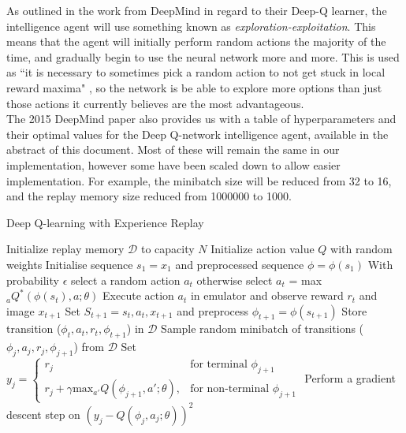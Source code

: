 \documentclass[10pt]{article}
\begin{document}
		As outlined in the work from DeepMind in regard to their Deep-Q learner, the intelligence agent will use something known as \textit{exploration-exploitation}. This means that the agent will initially perform random actions the majority of the time, and gradually begin to use the neural network more and more. This is used as ``it is necessary to sometimes pick a random action to not get stuck in local reward maxima" \cite{repli}, so the network is be able to explore more options than just those actions it currently believes are the most advantageous.\\
		
		The 2015 DeepMind paper also provides us with a table of hyperparameters and their optimal values for the Deep Q-network intelligence agent, available in the abstract of this document. Most of these will remain the same in our implementation, however some have been scaled down to allow easier implementation. For example, the minibatch size will be reduced from 32 to 16, and the replay memory size reduced from 1000000 to 1000.
		
		\begin{algorithm}
			\caption{Deep Q-learning with Experience Replay \cite{humanlevel}}
			\label{algo:agentAlgo}
			\begin{algorithmic}[]
				\State Initialize replay memory $\mathcal{D}$ to capacity $N$
				\State Initialize action value $Q$ with random weights				
					\State Initialise sequence $s_1 = {x_1}$ and preprocessed sequence $\phi = \phi(s_1)$
						\State With probability $\epsilon$ select a random action $a_t$
						\State otherwise select $a_t$ = max$_aQ^*(\phi(s_t),a;\theta)$
						\State Execute action $a_t$ in emulator and observe reward $r_t$ and image $x_{t+1}$
						\State Set $S_{t+1} = s_t,a_t,x_{t+1}$ and preprocess $\phi_{t+1} = \phi(s_{t+1})$
						\State Store transition ($\phi_t,a_t,r_t,\phi_{t+1}$) in $\mathcal{D}$
						\State Sample random minibatch of transitions ($\phi_j,a_j,r_j,\phi_{j+1}$) from $\mathcal{D}$
						\State Set $y_j =
							\begin{cases}
   								r_j& \text{for terminal } \phi_{j+1}\\
    							r_j + \gamma \text{max}_{a'}Q(\phi_{j+1},a';\theta),& \text{for non-terminal } \phi_{j+1}
							\end{cases}$
						\State Perform a gradient descent step on $(y_j - Q(\phi_j,a_j;\theta))^2$
					\EndFor
				\EndFor
			\end{algorithmic}
		\end{algorithm}
	
\end{document}
